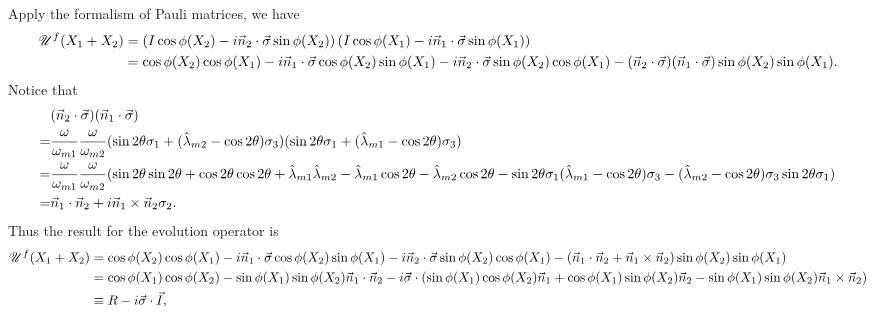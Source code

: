 \documentclass[letterpaper,12pt,english]{sphinxmanual}
\begin{document}
Apply the formalism of Pauli matrices, we have
\begin{gather}
\begin{split}\mathscr{U}^f (X_1+X_2) &= \left( I \cos \phi(X_2) - i \vec n_2 \cdot \vec \sigma \sin \phi(X_2) \right)  \left( I \cos \phi(X_1) - i \vec n_1 \cdot \vec \sigma \sin \phi(X_1) \right) \\
& = \cos \phi(X_2)\cos \phi(X_1) - i\vec n _1 \cdot \vec \sigma \cos\phi(X_2) \sin \phi(X_1) - i \vec n_2 \cdot \vec \sigma \sin \phi(X_2) \cos \phi(X_1) - (\vec n_2 \cdot \vec \sigma)(\vec n_1 \cdot \vec \sigma) \sin \phi (X_2) \sin \phi(X_1).\end{split}\notag
\end{gather}
Notice that
\begin{gather}
\begin{split}&(\vec n_2 \cdot \vec \sigma)(\vec n_1 \cdot \vec \sigma)  \\
=& \frac{\omega}{\omega_{m1}}\frac{\omega}{\omega_{m2}}( \sin 2\theta \sigma_1 + ( \hat\lambda_{m2} - \cos 2\theta ) \sigma_3 )( \sin 2\theta \sigma_1 + (\hat\lambda_{m1} -\cos 2\theta ) \sigma_3 ) \\
=& \frac{\omega}{\omega_{m1}}\frac{\omega}{\omega_{m2}} ( \sin 2\theta \sin 2\theta + \cos 2\theta \cos 2\theta + \hat \lambda_{m1}\hat\lambda_{m2} - \hat\lambda_{m1} \cos 2\theta - \hat\lambda_{m2}\cos 2\theta - \sin 2\theta \sigma_1 (\hat\lambda_{m1}- \cos 2\theta) \sigma_3  -  (\hat\lambda_{m2}- \cos 2\theta) \sigma_3 \sin 2\theta \sigma_1 ) \\
=& \vec n_1 \cdot \vec n_2 + i \vec n_1 \times \vec n_2 \sigma_2.\end{split}\notag
\end{gather}
Thus the result for the evolution operator is
\begin{gather}
\begin{split}\mathscr{U}^f (X_1+X_2) & = \cos \phi(X_2)\cos \phi(X_1) - i\vec n _1 \cdot \vec \sigma \cos\phi(X_2) \sin \phi(X_1) - i \vec n_2 \cdot \vec \sigma \sin \phi(X_2) \cos \phi(X_1) - (\vec n_1 \cdot \vec n_2 + \vec n_1 \times \vec n_2) \sin \phi (X_2) \sin \phi(X_1) \\
& = \cos \phi(X_1) \cos \phi(X_2) - \sin \phi(X_1)\sin \phi(X_2) \vec n_1\cdot \vec n_2  - i \vec \sigma\cdot ( \sin \phi(X_1) \cos \phi(X_2) \vec n_1 + \cos \phi(X_1) \sin \phi(X_2) \vec n_2 -  \sin \phi (X_1) \sin \phi(X_2) \vec n_1 \times \vec n_2 )\\
& \equiv R - i \vec \sigma \cdot \vec I,\end{split}\notag
\end{gather}
\end{document}
